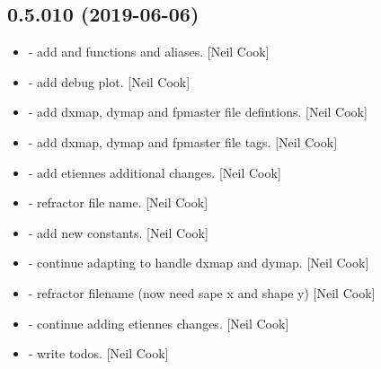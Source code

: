 \documentclass[a4paper,10pt,english]{report}
\begin{document}
\subsection{0.5.010 (2019-06-06)}
\label{\detokenize{misc/changelog:id126}}\begin{itemize}
\item {} 
 - add  and  functions and
aliases. {[}Neil Cook{]}

\item {} 
 - add  debug plot. {[}Neil
Cook{]}

\item {} 
 - add dxmap, dymap and fpmaster file defintions. {[}Neil
Cook{]}

\item {} 
 - add dxmap, dymap and fpmaster file tags. {[}Neil Cook{]}

\item {} 
 - add etiennes additional changes. {[}Neil Cook{]}

\item {} 
 - refractor file name. {[}Neil Cook{]}

\item {} 
 - add new  constants. {[}Neil Cook{]}

\item {} 
 - continue adapting  to handle
dxmap and dymap. {[}Neil Cook{]}

\item {} 
 - refractor filename (now need sape x and shape y)
{[}Neil Cook{]}

\item {} 
 - continue adding etiennes changes. {[}Neil Cook{]}

\item {} 
 - write todos. {[}Neil Cook{]}

\end{itemize}
\end{document}
